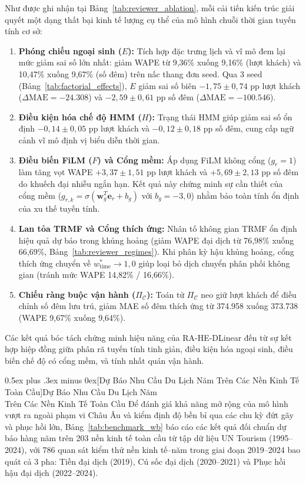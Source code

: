 \documentclass[10pt,journal,compsoc]{IEEEtran}
\makeatletter
\def\subsection{\@startsection{subsection}{2}{\z@}{-1.8ex plus -0.6ex minus -0.3ex}%
{0.5ex plus .3ex minus 0ex}{\normalfont\normalsize\rmfamily\bfseries}}
\makeatother
\begin{document}
Như được ghi nhận tại Bảng~\ref{tab:reviewer_ablation}, mỗi cải tiến kiến trúc giải quyết một dạng thất bại kinh tế lượng cụ thể của mô hình chuỗi thời gian tuyến tính cơ sở:
\begin{enumerate}\setlength{\itemsep}{1pt}\setlength{\parskip}{0pt}\setlength{\parsep}{0pt}
    \item \textbf{Phóng chiếu ngoại sinh ($E$):} Tích hợp đặc trưng lịch và vĩ mô đem lại mức giảm sai số lớn nhất: giảm WAPE từ 9,36\% xuống 9,16\% (lượt khách) và 10,47\% xuống 9,67\% (số đêm) trên nấc thang đơn seed. Qua 3 seed (Bảng~\ref{tab:factorial_effects}), $E$ giảm sai số biên $-1{,}75\pm0{,}74$ pp lượt khách ($\Delta\text{MAE} = -24.308$) và $-2{,}59\pm0{,}61$ pp số đêm ($\Delta\text{MAE} = -100.546$).
    \item \textbf{Điều kiện hóa chế độ HMM ($H$):} Trạng thái HMM giúp giảm sai số ổn định $-0{,}14\pm0{,}05$ pp lượt khách và $-0{,}12\pm0{,}18$ pp số đêm, cung cấp ngữ cảnh vĩ mô định vị biểu diễn thời gian.
    \item \textbf{Điều biến FiLM ($F$) và Cổng mềm:} Áp dụng FiLM không cổng ($g_r=1$) làm tăng vọt WAPE $+3{,}37\pm1{,}51$ pp lượt khách và $+5{,}69\pm2{,}13$ pp số đêm do khuếch đại nhiễu ngắn hạn. Kết quả này chứng minh sự cần thiết của cổng mềm ($g_{r,k}=\sigma(\mathbf{w}_g^T\mathbf{e}_r+b_g)$ với $b_g=-3{,}0$) nhằm bảo toàn tính ổn định của xu thế tuyến tính.
    \item \textbf{Lan tỏa TRMF và Cổng thích ứng:} Nhân tố không gian TRMF ổn định hiệu quả dự báo trong khủng hoảng (giảm WAPE đại dịch từ 76,98\% xuống 66,69\%, Bảng~\ref{tab:reviewer_regimes}). Khi phân kỳ hậu khủng hoảng, cổng thích ứng chuyển về $w_{\text{time}}^* \to 1{,}0$ giúp loại bỏ dịch chuyển phân phối không gian (tránh mức WAPE 14,82\% / 16,66\%).
    \item \textbf{Chiếu ràng buộc vận hành ($\Pi_{\mathcal{C}}$):} Toán tử $\Pi_{\mathcal{C}}$ neo giữ lượt khách để điều chỉnh số đêm lưu trú, giảm MAE số đêm thích ứng từ 374.958 xuống 373.738 (WAPE 9,67\% xuống 9,64\%).
\end{enumerate}
Các kết quả bóc tách chứng minh hiệu năng của RA-HE-DLinear đến từ sự kết hợp hiệp đồng giữa phân rã tuyến tính tinh giản, điều kiện hóa ngoại sinh, điều biến chế độ có cổng mềm, và tính nhất quán vận hành.

\subsection[Dự Báo Nhu Cầu Du Lịch Năm Trên Các Nền Kinh Tế Toàn Cầu]{Dự Báo Nhu Cầu Du Lịch Năm\\Trên Các Nền Kinh Tế Toàn Cầu}
\label{sec:benchmark_wb}
Để đánh giá khả năng mở rộng của mô hình vượt ra ngoài phạm vi Châu Âu và kiểm định độ bền bỉ qua các chu kỳ đứt gãy và phục hồi lớn, Bảng~\ref{tab:benchmark_wb} báo cáo các kết quả đối chuẩn dự báo hàng năm trên 203 nền kinh tế toàn cầu từ tập dữ liệu UN Tourism (1995--2024), với 786 quan sát kiểm thử nền kinh tế--năm trong giai đoạn 2019--2024 bao quát cả 3 pha: Tiền đại dịch (2019), Cú sốc đại dịch (2020--2021) và Phục hồi hậu đại dịch (2022--2024).
\end{document}
